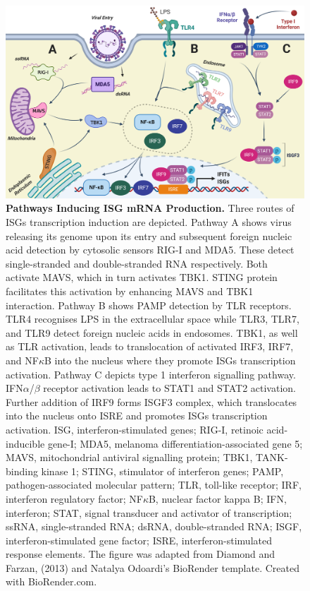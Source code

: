 \begin{figure}
    \centering
    \includegraphics[width=1\linewidth]{04. Introduction//Figs/01. IFIT transcription activation figure.png}
    \caption[Pathways Inducing ISG mRNA Production.]{\textbf{Pathways Inducing ISG mRNA Production.} Three routes of ISGs transcription induction are depicted. Pathway A shows virus releasing its genome upon its entry and subsequent foreign nucleic acid detection by cytosolic sensors RIG-I and MDA5. These detect single-stranded and double-stranded RNA respectively. Both activate MAVS, which in turn activates TBK1. STING protein facilitates this activation by enhancing MAVS and TBK1 interaction. Pathway B shows PAMP detection by TLR receptors. TLR4 recognises LPS in the extracellular space while TLR3, TLR7, and TLR9 detect foreign nucleic acids in endosomes. TBK1, as well as TLR activation, leads to translocation of activated IRF3, IRF7, and NF\(\kappa\)B into the nucleus where they promote ISGs transcription activation. Pathway C depicts type 1 interferon signalling pathway. IFN\(\alpha\)/\(\beta\) receptor activation leads to STAT1 and STAT2 activation. Further addition of IRF9 forms ISGF3 complex, which translocates into the nucleus onto ISRE and promotes ISGs transcription activation. ISG, interferon-stimulated genes; RIG-I, retinoic acid-inducible gene-I; MDA5, melanoma differentiation-associated gene 5; MAVS, mitochondrial antiviral signalling protein; TBK1, TANK-binding kinase 1; STING, stimulator of interferon genes; PAMP, pathogen-associated molecular pattern; TLR, toll-like receptor; IRF, interferon regulatory factor; NF\(\kappa\)B, nuclear factor kappa B; IFN, interferon; STAT, signal transducer and activator of transcription; ssRNA, single-stranded RNA; dsRNA, double-stranded RNA; ISGF, interferon-stimulated gene factor; ISRE, interferon-stimulated response elements. The figure was adapted from Diamond and Farzan, (2013) and Natalya Odoardi's BioRender template. Created with BioRender.com.}
    \label{fig:Pathways Inducing ISG mRNA Production.}
\end{figure}




